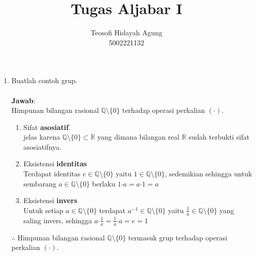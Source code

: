 \documentclass{article}
\title{Tugas Aljabar I}
\author{Teosofi Hidayah Agung\\
5002221132}
\date{}
\begin{document}
\maketitle
{}
\setlength{\belowdisplayskip}{-4.5mm}
\setlength{\abovedisplayskip}{1.5mm}
\allowdisplaybreaks

\begin{enumerate}
    \item Buatlah contoh grup.\\~\\
    \textbf{Jawab}:\\
    Himpunan bilangan rasional $\mathbb{Q}\setminus\{0\}$ terhadap operasi perkalian $(\boldsymbol{\cdot})$.
    \begin{enumerate}[label=(\arabic*)]
        \item Sifat \textbf{asosiatif}.\\
        jelas karena $\mathbb{Q}\setminus\{0\}\subset\mathbb{R}$ yang dimana bilangan real $\mathbb{R}$ sudah terbukti sifat asosiatifnya.
        \item Eksistensi \textbf{identitas}\\
        Terdapat identitas $e\in\mathbb{Q}\setminus\{0\}$ yaitu $1\in\mathbb{Q}\setminus\{0\}$, sedemikian sehingga untuk sembarang $a\in\mathbb{Q}\setminus\{0\}$ berlaku $1\boldsymbol{\cdot}a=a\boldsymbol{\cdot}1=a$ 
        \item Eksistensi \textbf{invers}\\
        Untuk setiap $a\in\mathbb{Q}\setminus\{0\}$ terdapat $a^{-1}\in\mathbb{Q}\setminus\{0\}$ yaitu $\frac{1}{a}\in\mathbb{Q}\setminus\{0\}$ yang saling invers, sehingga $a\boldsymbol{\cdot}\frac{1}{a}=\frac{1}{a}\boldsymbol{\cdot}a=e=1$
    \end{enumerate}
    $\therefore$ Himpunan bilangan rasional $\mathbb{Q}\setminus\{0\}$ termasuk grup terhadap operasi perkalian $(\boldsymbol{\cdot})$.
    

\end{enumerate}
\end{document}
